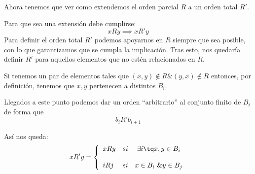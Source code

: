 \begin{problem}[2]
	Ahora tenemos que ver como extendemos el orden parcial $R$ a un orden total $R'$. 

	Para que sea una extensión debe cumplirse:
	\[xRy \implies xR'y\]
	Para definir el orden total $R'$ podemos apoyarnos en $R$ siempre que sea posible, con lo que garantizamos que se cumpla la implicación. Tras esto, nos quedaría definir $R'$ para aquellos elementos que no estén relacionados en $R$.

	Si tenemos un par de elementos tales que $(x,y)\notin R \& (y,x)\notin R$ entonces, por definición, tenemos que $x,y$ pertenecen a distintos $B_i$. 

	Llegados a este punto podemos dar un orden ``arbitrario'' al conjunto finito de $B_i$ de forma que 
	\[b_i R' b_{i+1} \]

	Así nos queda:
	\[
	xR'y = \left\{ \begin{array}{lcc}
             xRy &   si  & \exists i  \tq x,y \in B_i \\
             \\ i R j &  si  & x \in B_i \ \& y \in B_j 
             \end{array}
   \right.\]
	\end{problem}
	
